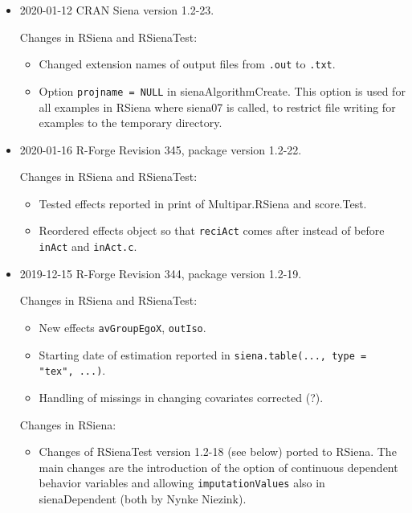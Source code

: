 \documentclass[a4paper,fleqn,11pt]{article}
\newcommand{\+}{\, + \,}
\newcommand{\sfn}[1]{\textsf{#1}}
\begin{document}
\begin{small}
\begin{itemize}
\item 2020-01-12 CRAN Siena version 1.2-23.

Changes in \textsf{RSiena} and \textsf{RSienaTest}:
\begin{itemize}
\item Changed extension names of output files from \texttt{.out} to
    \texttt{.txt}.
\item Option \texttt{projname = NULL} in \textsf{sienaAlgorithmCreate}.
     This option is used for all examples in \sfn{RSiena} where \textsf{siena07} is called,
     to restrict file writing for examples to the temporary directory.
\end{itemize}



\item 2020-01-16 R-Forge Revision 345, package version 1.2-22.

Changes in \textsf{RSiena} and \textsf{RSienaTest}:
\begin{itemize}
\item Tested effects reported in print of \sfn{Multipar.RSiena} and
        \sfn{score.Test}.
\item Reordered effects object so that \texttt{reciAct} comes after instead of
     before \texttt{inAct} and \texttt{inAct.c}.
\end{itemize}


\item 2019-12-15 R-Forge Revision 344, package version 1.2-19.

Changes in \textsf{RSiena} and \textsf{RSienaTest}:
\begin{itemize}
 \item New effects \texttt{avGroupEgoX}, \texttt{outIso}.
 \item Starting date of estimation reported in
     \texttt{siena.table(..., type = "tex", ...)}.
\item Handling of missings in changing covariates corrected (?).
\end{itemize}

Changes in RSiena:
\begin{itemize}
 \item Changes of \textsf{RSienaTest} version 1.2-18 (see below)
      ported to RSiena.
      The main changes are the introduction of the option of
      continuous dependent behavior variables
      and allowing  \texttt{imputationValues} also in \textsf{sienaDependent}
      (both by Nynke Niezink).
\end{itemize}


\end{itemize}
\end{small}
\end{document}
